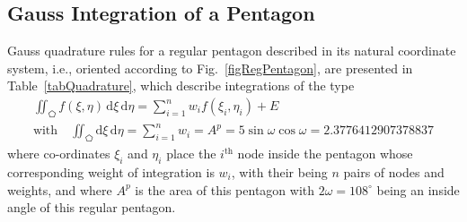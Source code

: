 \subsection{Gauss Integration of a Pentagon}

Gauss quadrature rules for a regular pentagon described in its natural coordinate system, i.e., oriented according to Fig.~\ref{figRegPentagon}, are presented in Table~\ref{tabQuadrature}, which describe integrations of the type
\begin{multline}
    \iint_{\pentagon} f ( \xi , \eta) \, \mathrm{d} \xi \, \mathrm{d} \eta = 
    \sum_{i=1}^n w_i f ( \xi_i , \eta_i ) + E \\
    \text{with} \quad
    \iint_{\pentagon} \mathrm{d} \xi \, \mathrm{d} \eta = \sum_{i=1}^n w_i =
    A^p = 5 \sin \omega \cos \omega = 2.3776412907378837 
\end{multline}
where co-ordinates $\xi_i$ and $\eta_i$ place the $i^{\text{th}}$ node inside the pentagon whose corresponding weight of integration is $w_i$, with their being $n$ pairs of nodes and weights, and where $A^p$ is the area of this pentagon with $2 \omega = 108^{\circ}$ being an inside angle of this regular pentagon. 

